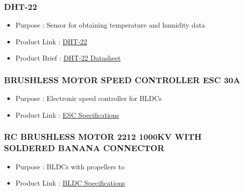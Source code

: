 \documentclass[a4paper,12pt,oneside]{book}
\begin{document}
 \subsubsection{DHT-22} 

\begin{itemize}
  \item Purpose : Sensor for obtaining temperature and humidity data 
  \item Product Link : \href{https://www.amazon.in/Generic-Digital-Temperature-Humidity-Sensor/dp/B00O8RIYYU}{DHT-22} 
  \item Product Brief : \href{https://www.sparkfun.com/datasheets/Sensors/Temperature/DHT22.pdf}{DHT-22 Datasheet} 
 \end{itemize}
 
  \subsubsection{BRUSHLESS MOTOR SPEED CONTROLLER ESC 30A} 

\begin{itemize}
  \item Purpose : Electronic speed controller for BLDCs
  \item Product Link : \href{https://robokits.co.in/quadrotors-hexarotors-drones/brushless-motors-esc/brushless-motor-speed-controller-esc-30a/}{ESC Specifications} 
 \end{itemize}

\subsubsection{RC BRUSHLESS MOTOR 2212 1000KV WITH SOLDERED BANANA CONNECTOR} 

\begin{itemize}
  \item Purpose : BLDCs with propellers to 
  \item Product Link : \href{https://robokits.co.in/quadrotors-hexarotors-drones/brushless-motors-esc/brushless-motor-speed-controller-esc-30a/}{BLDC Specifications} 
 \end{itemize}
\end{document}
